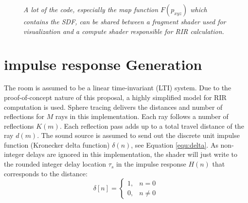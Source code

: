 \documentclass[twoside,a4paper]{article}
\begin{document}
\begin{figure}[ht]
\center
{}
\caption{\label{fig:bd_shaders}{\it A lot of the code, especially the map function $F(p_{xyz})$ which contains the SDF, can be shared between a fragment shader used for visualization and a compute shader responsible for RIR calculation.}}
\end{figure}





\section{impulse response Generation}
The room is assumed to be a linear time-invariant (LTI) system. Due to the proof-of-concept nature of this proposal, a highly simplified model for RIR computation is used. Sphere tracing delivers the distances and number of reflections for $M$ rays in this implementation. Each ray follows a number of reflections $K(m)$. Each reflection pass adds up to a total travel distance of the ray $d(m)$. The sound source is assumed to send out the discrete unit impulse function (Kronecker delta function) $\delta(n)$, see Equation \ref{equ:delta}. As non-integer delays are ignored in this implementation, the shader will just write to the rounded integer delay location $\tau_s$ in the impulse response $H(n)$ that corresponds to the distance:
\begin{equation}
\label{equ:delta}
\delta [n]={\begin{cases}1,&n=0\\0,&n\neq 0\end{cases}}\,
\end{equation}
\end{document}
